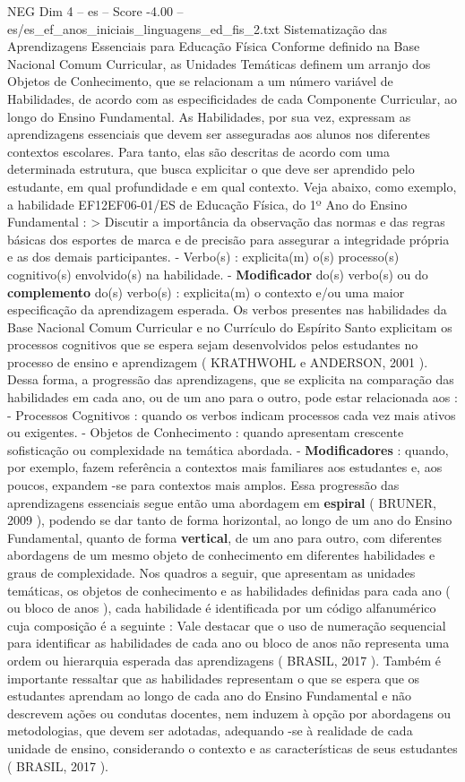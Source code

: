 \begin{textsample}{NEG Dim 4 – es – Score -4.00 – es/es\_ef\_anos\_iniciais\_linguagens\_ed\_fis\_2.txt}  \label{ex:f4_neg_212}
Sistematização das Aprendizagens Essenciais para Educação Física Conforme definido na Base Nacional Comum Curricular, as Unidades Temáticas definem um arranjo dos Objetos de Conhecimento, que se relacionam a um número variável de Habilidades, de acordo com as especificidades de cada Componente Curricular, ao longo do Ensino Fundamental.
As Habilidades, por sua vez, expressam as aprendizagens essenciais que devem ser asseguradas aos alunos nos diferentes contextos escolares.
Para tanto, elas são descritas de acordo com uma determinada estrutura, que busca explicitar o que deve ser aprendido pelo estudante, em qual profundidade e em qual contexto.
Veja abaixo, como exemplo, a habilidade EF12EF06-01/ES de Educação Física, do 1º Ano do Ensino Fundamental : > Discutir a importância da observação das normas e das regras básicas dos esportes de marca e de precisão para assegurar a integridade própria e as dos demais participantes. - Verbo(s) : explicita(m) o(s) processo(s) cognitivo(s) envolvido(s) na habilidade. - \textbf{Modificador} do(s) verbo(s) ou do \textbf{complemento} do(s) verbo(s) : explicita(m) o contexto e/ou uma maior especificação da aprendizagem esperada.
Os verbos presentes nas habilidades da Base Nacional Comum Curricular e no Currículo do Espírito Santo explicitam os processos cognitivos que se espera sejam desenvolvidos pelos estudantes no processo de ensino e aprendizagem ( KRATHWOHL e ANDERSON, 2001 ).
Dessa forma, a progressão das aprendizagens, que se explicita na comparação das habilidades em cada ano, ou de um ano para o outro, pode estar relacionada aos : - Processos Cognitivos : quando os verbos indicam processos cada vez mais ativos ou exigentes. - Objetos de Conhecimento : quando apresentam crescente sofisticação ou complexidade na temática abordada. - \textbf{Modificadores} : quando, por exemplo, fazem referência a contextos mais familiares aos estudantes e, aos poucos, expandem -se para contextos mais amplos.
Essa progressão das aprendizagens essenciais segue então uma abordagem em \textbf{espiral} ( BRUNER, 2009 ), podendo se dar tanto de forma horizontal, ao longo de um ano do Ensino Fundamental, quanto de forma \textbf{vertical}, de um ano para outro, com diferentes abordagens de um mesmo objeto de conhecimento em diferentes habilidades e graus de complexidade.
Nos quadros a seguir, que apresentam as unidades temáticas, os objetos de conhecimento e as habilidades definidas para cada ano ( ou bloco de anos ), cada habilidade é identificada por um código alfanumérico cuja composição é a seguinte : Vale destacar que o uso de numeração sequencial para identificar as habilidades de cada ano ou bloco de anos não representa uma ordem ou hierarquia esperada das aprendizagens ( BRASIL, 2017 ).
Também é importante ressaltar que as habilidades representam o que se espera que os estudantes aprendam ao longo de cada ano do Ensino Fundamental e não descrevem ações ou condutas docentes, nem induzem à opção por abordagens ou metodologias, que devem ser adotadas, adequando -se à realidade de cada unidade de ensino, considerando o contexto e as características de seus estudantes ( BRASIL, 2017 ).

\end{textsample}
